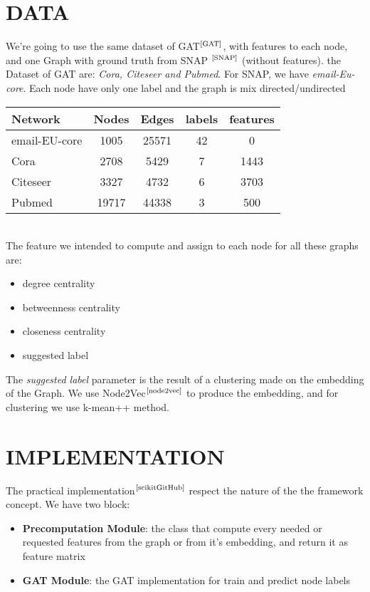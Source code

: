 \documentclass[12pt,conference]{ieeeconf} %
\begin{document}
\section{DATA} 
We're going to use the same dataset of GAT$^\text{\cite{GAT}}$, with features to each node, and one Graph with ground truth from SNAP $^\text{\cite{SNAP}}$ (without features).
the Dataset of GAT are: \textit{Cora, Citeseer and Pubmed}. For SNAP, we have \textit{email-Eu-core}. Each node have only one label and the graph is mix directed/undirected
\\
\begin{table}[h!]
    \centering
    \renewcommand{\arraystretch}{1.5}
    \begin{tabular}{|l|c|c|c|c|}
    \hline
    \textbf{Network} & \textbf{Nodes} & \textbf{Edges} & \textbf{labels} & \textbf{features} \\
    \hline
    email-EU-core  & 1005 & 25571 & 42 & 0     \\
    Cora           & 2708 & 5429  & 7  & 1443  \\
    Citeseer       & 3327 & 4732  & 6  & 3703  \\
    Pubmed        & 19717 & 44338 & 3  & 500   \\
    \hline
    \end{tabular}
\end{table}
\\
The feature we intended to compute and assign to each node for all these graphs are:
\begin{itemize}
    \item degree centrality
    \item betweenness centrality
    \item closeness centrality
    \item suggested label
\end{itemize}
The \textit{suggested label} parameter is the result of a clustering made on the embedding of the Graph.
We use Node2Vec$^\text{\cite{node2vec}}$ to produce the embedding, and for clustering we use k-mean++ method.


\section{IMPLEMENTATION} 
The practical implementation$^{\text{\cite{scikitGitHub}}}$ respect the nature of the the framework concept.
We have two block:
\begin{itemize}
    \item{\textbf{Precomputation Module}: the class that compute every needed or requested features from the graph or from it's embedding, and return it as feature matrix}
    \item{\textbf{GAT Module}: the GAT implementation for train and predict node labels}
\end{itemize}
\end{document}
